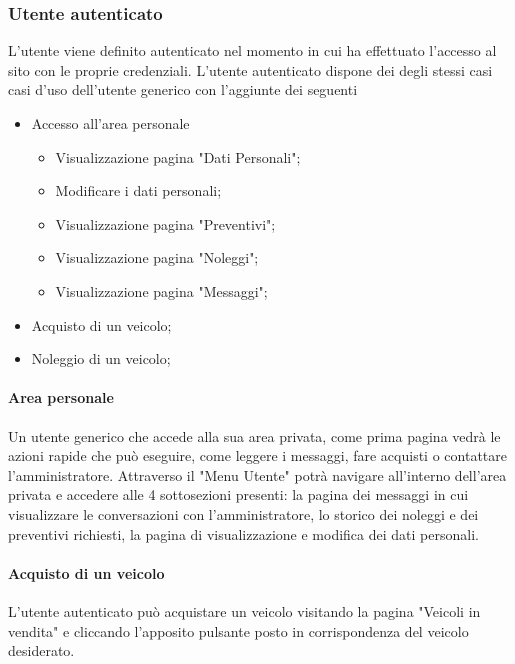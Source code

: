         \subsubsection{Utente autenticato}
        L’utente viene definito autenticato nel momento in cui ha effettuato l'accesso al sito con le proprie credenziali.
        L’utente autenticato dispone dei degli stessi casi casi d’uso dell'utente generico con l'aggiunte dei seguenti
        \begin{itemize}
            \item Accesso all'area personale
            \begin{itemize}
                \item Visualizzazione pagina "Dati Personali";
                \item Modificare i dati personali;
                \item Visualizzazione pagina "Preventivi";
                \item Visualizzazione pagina "Noleggi";
                \item Visualizzazione pagina "Messaggi";
            \end{itemize}
            \item Acquisto di un veicolo;
            \item Noleggio di un veicolo;
        \end{itemize}

        \paragraph{Area personale} Un utente generico che accede alla sua area privata, come prima pagina vedrà le azioni rapide che può eseguire, come leggere i messaggi, fare acquisti o contattare l'amministratore. Attraverso il "Menu Utente" potrà navigare all'interno dell'area privata e accedere alle 4 sottosezioni presenti: la pagina dei messaggi in cui visualizzare le conversazioni con l'amministratore, lo storico dei noleggi e dei preventivi richiesti, la pagina di visualizzazione e  modifica dei dati personali.

        \paragraph{Acquisto di un veicolo}
        L'utente autenticato può acquistare un veicolo visitando la pagina "Veicoli in vendita" e cliccando l'apposito pulsante posto in corrispondenza del veicolo desiderato.

